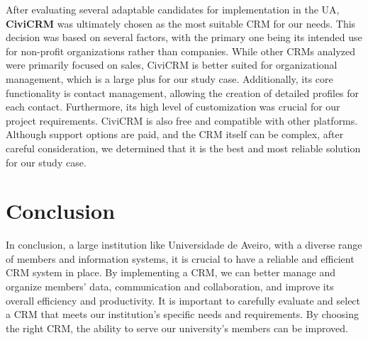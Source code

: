 \documentclass{article}
\begin{document}
After evaluating several adaptable candidates for implementation in the UA, \textbf{CiviCRM} was ultimately chosen as the most suitable CRM for our needs. This decision was based on several factors, with the primary one being its intended use for non-profit organizations rather than companies. While other CRMs analyzed were primarily focused on sales, CiviCRM is better suited for organizational management, which is a large plus for our study case. Additionally, its core functionality is contact management, allowing the creation of detailed profiles for each contact. Furthermore, its high level of customization was crucial for our project requirements. CiviCRM is also free and compatible with other platforms. Although support options are paid, and the CRM itself can be complex, after careful consideration, we determined that it is the best and most reliable solution for our study case.




\section{Conclusion}

In conclusion, a large institution like Universidade de Aveiro, with a diverse range of members and information systems, it is crucial to have a reliable and efficient CRM system in place. By implementing a CRM, we can better manage and organize members' data, communication and collaboration, and improve its overall efficiency and productivity. It is important to carefully evaluate and select a CRM that meets our institution's specific needs and requirements. By choosing the right CRM, the ability to serve our university's members can be improved.


\nocite{*}
\printbibliography
\end{document}

